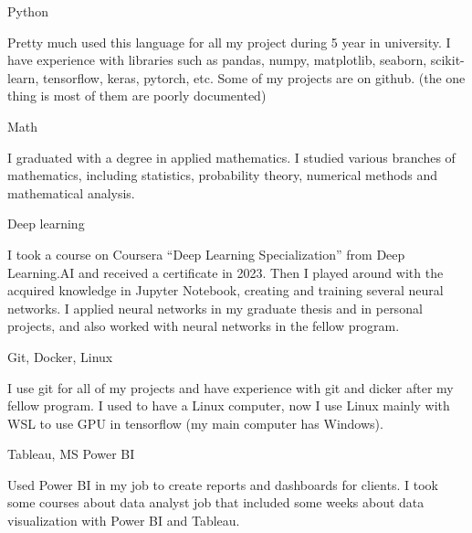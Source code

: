 \documentclass[10pt, letterpaper]{article}
\begin{document}
            
        \begin{onecolentry}
            \begin{highlightsforbulletentries}


            \item Python

            Pretty much used this language for all my project during 5 year in university. 
            I have experience with libraries such as pandas, numpy, matplotlib, seaborn, scikit-learn, tensorflow, keras, pytorch, etc.
            Some of my projects are on github. (the one thing is most of them are poorly documented)


            \item Math
            

            I graduated with a degree in applied mathematics. 
            I studied various branches of mathematics, including statistics, probability theory, numerical methods and mathematical analysis.


            \item Deep learning
            

            I took a course on Coursera “Deep Learning Specialization” from Deep Learning.AI and received a certificate in 2023.
            Then I played around with the acquired knowledge in Jupyter Notebook, creating and training several neural networks.
            I applied neural networks in my graduate thesis and in personal projects, and also worked with neural networks in the fellow program.

            \item Git, Docker, Linux
            

            I use git for all of my projects and have experience with git and dicker after my fellow program.
            I used to have a Linux computer, now I use Linux mainly with WSL to use GPU in tensorflow (my main computer has Windows).
            
            
            \item Tableau, MS Power BI
            

            Used Power BI in my job to create reports and dashboards for clients.
            I took some courses about data analyst job that included some weeks about data visualization with Power BI and Tableau.
            

            \end{highlightsforbulletentries}
        \end{onecolentry}
\end{document}
